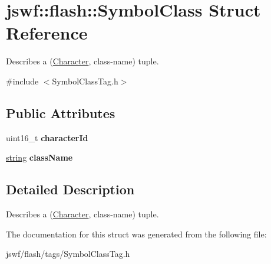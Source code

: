 \hypertarget{structjswf_1_1flash_1_1_symbol_class}{\section{jswf\+:\+:flash\+:\+:Symbol\+Class Struct Reference}
\label{structjswf_1_1flash_1_1_symbol_class}
}


Describes a ({\ttfamily \hyperlink{classjswf_1_1flash_1_1_character}{Character}}, class-\/name) tuple.  




{\ttfamily \#include $<$Symbol\+Class\+Tag.\+h$>$}

\subsection*{Public Attributes}
\begin{DoxyCompactItemize}
\item 
\hypertarget{structjswf_1_1flash_1_1_symbol_class_a94baeada1f8e2bb666318370fe2b1cff}{uint16\+\_\+t {\bfseries character\+Id}}\label{structjswf_1_1flash_1_1_symbol_class_a94baeada1f8e2bb666318370fe2b1cff}

\item 
\hypertarget{structjswf_1_1flash_1_1_symbol_class_a39a75f324e0673380f888de77922e708}{\hyperlink{namespacejswf_a755127d61081aa8af105eb800aa2c1ec}{string} {\bfseries class\+Name}}\label{structjswf_1_1flash_1_1_symbol_class_a39a75f324e0673380f888de77922e708}

\end{DoxyCompactItemize}


\subsection{Detailed Description}
Describes a ({\ttfamily \hyperlink{classjswf_1_1flash_1_1_character}{Character}}, class-\/name) tuple. 

The documentation for this struct was generated from the following file\+:\begin{DoxyCompactItemize}
\item 
jswf/flash/tags/Symbol\+Class\+Tag.\+h\end{DoxyCompactItemize}
